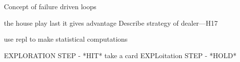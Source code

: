 

Concept of failure driven loops

the house play last it gives advantage
Describe strategy of dealer---H17


use repl to make statistical computations


EXPLORATION STEP  -  *HIT* take a card
EXPLoitation STEP - *HOLD* 
